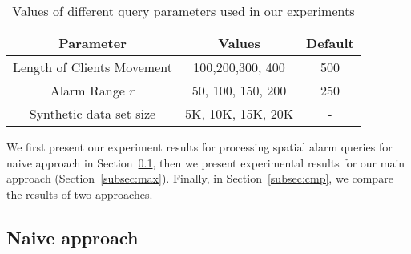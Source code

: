 \vspace*{10pt}
\begin{table}[htbp]
  \centering

\begin{tabular}{|c|c|c|}  \hline
  Parameter& Values & Default\\
  \hline
  Length of Clients Movement & 100,200,300, 400 & 500 \\
  \hline
  Alarm Range $r$& 50, 100, 150, 200 & 250\\
  \hline
  Synthetic data set size & 5K, 10K, 15K, 20K & - \\
  \hline
\end{tabular}
\caption{Values of different query parameters used in our experiments} \label{table:exp_setup} \vspace{-2mm}
\end{table}


We first present our experiment results for processing spatial alarm queries for naive approach in Section~\ref{subsec:sum},
then we present experimental results for our main approach (Section~\ref{subsec:max}). Finally, in Section~\ref{subsec:cmp}, we compare the results of two approaches.


\subsection{Naive approach}
\label{subsec:sum}


